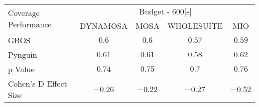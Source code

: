 \begin{tabular}{lcccc}\toprule 
\multirow{2}{*}{Coverage Performance} & \multicolumn{4}{c}{Budget - 600[s] } \\ \cmidrule(lr){2-5}  
                                      & DYNAMOSA&MOSA&WHOLESUITE&MIO                         \\ \midrule 
GBOS                                  & \(0.6\)&\(0.6\)&\(0.57\)&\(0.59\)                       \\ 
Pynguin                               & \(0.61\)&\(0.61\)&\(0.58\)&\(0.62\)                       \\ 
p Value                               & \(0.74\)&\(0.75\)&\(0.7\)&\(0.76\)                     \\ 
Cohen's D Effect Size                 & \(-0.26\)&\(-0.22\)&\(-0.27\)&\(-0.52\)                       \\ 
\bottomrule 
\end{tabular}